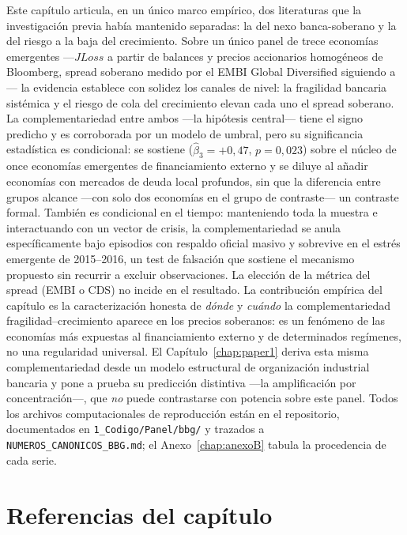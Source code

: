 Este capítulo articula, en un único marco empírico, dos literaturas que la investigación previa había mantenido separadas: la del nexo banca-soberano y la del riesgo a la baja del crecimiento. Sobre un único panel de trece economías emergentes —$JLoss$ a partir de balances y precios accionarios homogéneos de Bloomberg, spread soberano medido por el EMBI Global Diversified siguiendo a \citet{Chari2024b}— la evidencia establece con solidez los canales de nivel: la fragilidad bancaria sistémica y el riesgo de cola del crecimiento elevan cada uno el spread soberano. La complementariedad entre ambos —la hipótesis central— tiene el signo predicho y es corroborada por un modelo de umbral, pero su significancia estadística es condicional: se sostiene ($\hat\beta_3=+0{,}47$, $p=0{,}023$) sobre el núcleo de once economías emergentes de financiamiento externo y se diluye al añadir economías con mercados de deuda local profundos, sin que la diferencia entre grupos alcance —con solo dos economías en el grupo de contraste— un contraste formal. También es condicional en el tiempo: manteniendo toda la muestra e interactuando con un vector de crisis, la complementariedad se anula específicamente bajo episodios con respaldo oficial masivo y sobrevive en el estrés emergente de 2015--2016, un test de falsación que sostiene el mecanismo propuesto sin recurrir a excluir observaciones. La elección de la métrica del spread (EMBI o CDS) no incide en el resultado. La contribución empírica del capítulo es la caracterización honesta de \emph{dónde} y \emph{cuándo} la complementariedad fragilidad--crecimiento aparece en los precios soberanos: es un fenómeno de las economías más expuestas al financiamiento externo y de determinados regímenes, no una regularidad universal. El Capítulo~\ref{chap:paper1} deriva esta misma complementariedad desde un modelo estructural de organización industrial bancaria y pone a prueba su predicción distintiva —la amplificación por concentración—, que \emph{no} puede contrastarse con potencia sobre este panel. Todos los archivos computacionales de reproducción están en el repositorio, documentados en \texttt{1\_Codigo/Panel/bbg/} y trazados a \texttt{NUMEROS\_CANONICOS\_BBG.md}; el Anexo~\ref{chap:anexoB} tabula la procedencia de cada serie.

\section*{Referencias del capítulo}

